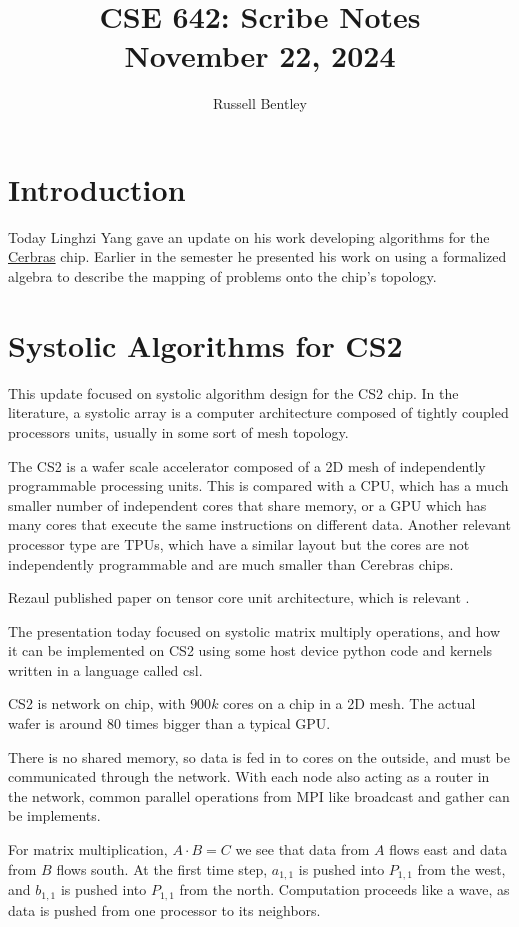 \documentclass{article}
\title{CSE 642: Scribe Notes \\ November 22, 2024}
\author{Russell Bentley}
\begin{document}
\maketitle

\section{Introduction}
Today Linghzi Yang gave an update on his work developing algorithms for the \href{https://cerebras.ai}{Cerbras} chip. Earlier in the semester he presented his work on using a formalized algebra to describe the mapping of problems onto the chip's topology.

\section{Systolic Algorithms for CS2}

This update focused on systolic algorithm design for the CS2 chip. In the literature, a systolic array is a computer architecture composed of tightly coupled processors units, usually in some sort of mesh topology.

The CS2 is a wafer scale accelerator composed of a 2D mesh of independently programmable processing units.
This is compared with a CPU, which has a much smaller number of independent cores that share memory, or a GPU 
which has many cores that execute the same instructions on different data. Another relevant processor type
are TPUs, which have a similar layout but the cores are not independently programmable and are much smaller than Cerebras chips.

Rezaul published paper on tensor core unit architecture, which is relevant \cite{Chowdhury2021}.

The presentation today focused on systolic matrix multiply operations, and how it can be implemented on CS2 using some host device python code and kernels written in a language called csl.

CS2 is network on chip, with $900k$ cores on a chip in a 2D mesh. The actual wafer is around $80$
times bigger than a typical GPU.

There is no shared memory, so data is fed in to cores on the outside, and must be communicated through the network.
With each node also acting as a router in the network, common parallel operations from MPI like broadcast and gather can be implements.

For matrix multiplication, $A \cdot B = C$ we see that data from $A$ flows east and data from $B$ flows south.
At the first time step, $a_{1,1}$ is pushed into $P_{1, 1}$ from the west, and $b_{1, 1}$ is pushed into $P_{1, 1}$ from the north. Computation proceeds like a wave, as data is pushed from one processor to its neighbors.
\end{document}
